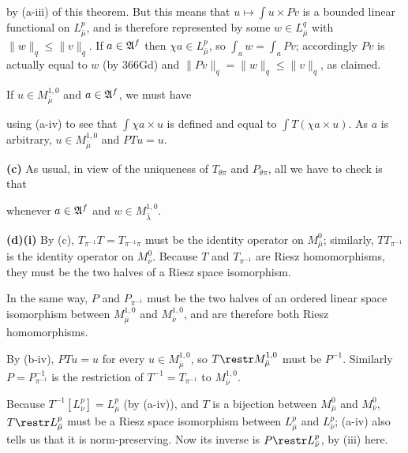 {\noindent by (a-iii) of this theorem.   But this means that $u\mapsto
\int u\times Pv$ is a bounded linear functional on $L^p_{\bar\mu}$, and
is therefore represented by some $w\in L^q_{\bar\mu}$ with
$\|w\|_q\le\|v\|_q$.   If $a\in\frak A^f$ then
$\chi a\in L^p_{\bar\mu}$, so
$\int_aw=\int_aPv$;  accordingly $Pv$ is actually equal to $w$ (by
366Gd) and
$\|Pv\|_q=\|w\|_q\le\|v\|_q$, as claimed.

\medskip

 If $u\in M^{1,0}_{\bar\mu}$ and $a\in\frak A^f$, we must
have


\noindent using (a-iv) to see that $\int\chi a\times u$ is defined and
equal to $\int T(\chi a\times u)$.   As $a$ is arbitrary, $u\in
M^{1,0}_{\bar\mu}$ and $PTu=u$.

\medskip

{\bf (c)} As usual, in view of the uniqueness of $T_{\theta\pi}$ and
$P_{\theta\pi}$, all we have to check is that



\noindent whenever $a\in\frak A^f$ and $w\in M^{1,0}_{\bar\lambda}$.

\medskip

{\bf (d)(i)} By (c), $T_{\pi^{-1}}T=T_{\pi^{-1}\pi}$ must be the
identity operator on $M^0_{\bar\mu}$;  similarly, $TT_{\pi^{-1}}$ is the
identity operator on $M^0_{\bar\nu}$.   Because $T$ and $T_{\pi^{-1}}$
are Riesz homomorphisms, they must be the two halves of a Riesz space
isomorphism.

\medskip

 In the same way, $P$ and $P_{\pi^{-1}}$ must be the two
halves of an ordered linear space isomorphism between
$M^{1,0}_{\bar\mu}$ and $M^{1,0}_{\bar\nu}$, and are therefore both
Riesz homomorphisms.

\medskip

 By (b-iv), $PTu=u$ for every $u\in M^{1,0}_{\bar\mu}$,
so $T\restr M^{1,0}_{\bar\mu}$ must be $P^{-1}$.
Similarly $P=P_{\pi^{-1}}^{-1}$ is the restriction of
$T^{-1}=T_{\pi^{-1}}$ to $M^{1,0}_{\bar\nu}$.

\medskip

 Because $T^{-1}[L^p_{\bar\nu}]=L^p_{\bar\mu}$
(by (a-iv)), and $T$ is a bijection between $M^0_{\bar\mu}$ and
$M^0_{\bar\nu}$, $T\restr L^p_{\bar\mu}$ must be a Riesz space
isomorphism between $L^p_{\bar\mu}$ and $L^p_{\bar\nu}$;  (a-iv) also
tells us that it is norm-preserving.   Now its inverse is
$P\restr L^p_{\bar\nu}$, by (iii) here.
}%


